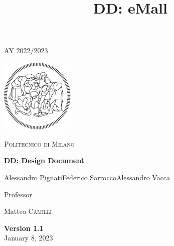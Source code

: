 \documentclass{article}
\title{\textbf{DD: eMall}}
\begin{document}
\begin{titlepage}
    \centering
    {\scshape\large AY 2022/2023 \par}
    \vfill
    \includegraphics[width=100pt]{img/logo-polimi-new}\par\vspace{1cm}
    {\scshape\LARGE Politecnico di Milano \par}
    \vspace{1.5cm}
    {\huge\bfseries DD\@: Design Document \par}
    \vspace{2cm}
    {\large {Alessandro Pignati\quad Federico Sarrocco\quad Alessandro Vacca}\par}
    \vfill
    {\large Professor\par
        Matteo \textsc{Camilli}}
    \vfill
    {\large \textbf{Version 1.1}\\ January 8, 2023 \par}
\end{titlepage}
\clearpage
\tableofcontents
{}
\clearpage
{}






\end{document}
